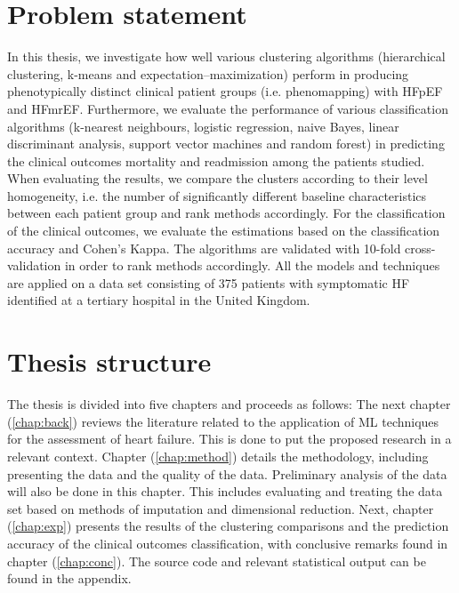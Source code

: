 \documentclass[../thesis.tex]{subfiles}
\begin{document}
\section{Problem statement}
\label{sec:prob_stat}

\noindent In this thesis, we investigate how well various clustering algorithms (hierarchical clustering, k-means and expectation–maximization) perform in producing phenotypically distinct clinical patient groups (i.e. phenomapping) with HFpEF and HFmrEF. Furthermore, we evaluate the performance of various classification algorithms (k-nearest neighbours, logistic regression, naive Bayes, linear discriminant analysis, support vector machines and random forest) in predicting the clinical outcomes mortality and readmission among the patients studied. When evaluating the results, we compare the clusters according to their level homogeneity, i.e. the number of significantly different baseline characteristics between each patient group and rank methods accordingly. For the classification of the clinical outcomes, we evaluate the estimations based on the classification accuracy and Cohen's Kappa. The algorithms are validated with 10-fold cross-validation in order to rank methods accordingly. All the models and techniques are applied on a data set consisting of 375 patients with symptomatic HF identified at a tertiary hospital in the United Kingdom.  

\section{Thesis structure}
\label{sec:thesis_struc}

\noindent The thesis is divided into five chapters and proceeds as follows: The next chapter (\ref{chap:back}) reviews the literature related to the application of ML techniques for the assessment of heart failure. This is done to put the proposed research in a relevant context. Chapter (\ref{chap:method}) details the methodology, including presenting the data and the quality of the data. Preliminary analysis of the data will also be done in this chapter. This includes evaluating and treating the data set based on methods of imputation and dimensional reduction. Next, chapter (\ref{chap:exp}) presents the results of the clustering comparisons and the prediction accuracy of the clinical outcomes classification, with conclusive remarks found in chapter (\ref{chap:conc}). The source code and relevant statistical output can be found in the appendix.
\end{document}
